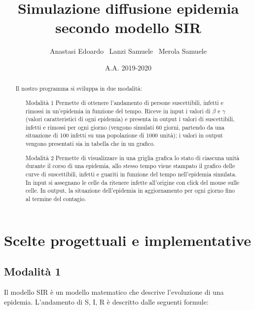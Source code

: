 \documentclass[a4paper,10 pt]{article}
\title{\huge{Simulazione diffusione epidemia secondo modello SIR}}
\author{Anastasi Edoardo \  Lanzi Samuele \ Merola Samuele}
\date{A.A. 2019-2020}
\begin{document}
\maketitle 


\begin{abstract}
 Il nostro programma si sviluppa in due modalità:
 \begin{itemize}
	\item[Modalità 1] Permette di ottenere l'andamento di persone suscettibili, infetti e rimossi in un'epidemia in funzione del tempo. Riceve in input i valori di $\beta$ e $\gamma$ (valori caratteristici di ogni epidemia) e presenta in output i valori di suscettibili, infetti e rimossi per ogni giorno (vengono simulati 60 giorni, partendo da una situazione di 100 infetti su una popolazione di 1000 unità); i valori in output vengono presentati sia in tabella che in un grafico.
 \item[Modalità 2] Permette di visualizzare in una griglia grafica lo stato di ciascuna unità durante il corso di una epidemia, allo stesso tempo viene stampato il grafico delle curve di suscettibili, infetti e guariti in funzione del tempo nell'epidemia simulata. In input si assegnano le celle da ritenere infette all'origine con click del mouse sulle celle. In output, la situazione dell'epidemia in aggiornamento per ogni giorno fino al termine del contagio.
  \end{itemize}
\end{abstract}



\section{Scelte progettuali e implementative} 
\subsection{Modalità 1}
Il modello SIR è un modello matematico che descrive l'evoluzione di una epidemia. L'andamento di S, I, R è descritto dalle seguenti formule:
\end{document}
